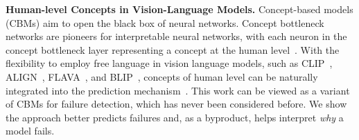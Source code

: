 \vspace{5pt}
\noindent\textbf{Human-level Concepts in Vision-Language Models.}
Concept-based models (CBMs) aim to open the black box of neural networks. 
Concept bottleneck networks are pioneers for interpretable neural networks, with each neuron in the concept bottleneck layer representing a concept at the human level~\cite{Koh2020ConceptBM, Yuksekgonul2022PosthocCB}.
With the flexibility to employ free language in vision language models, such as CLIP~\cite{Radford2021LearningTV}, ALIGN~\cite{Jia2021ScalingUV}, FLAVA~\cite{Singh2021FLAVAAF}, and BLIP~\cite{Li2022BLIPBL, Li2023BLIP2BL}, concepts of human level can be naturally integrated into the prediction mechanism~\cite{Menon2022VisualCV, Yang2022LanguageIA, Oikarinen2023LabelFreeCB}.
This work can be viewed as a variant of CBMs for failure detection, which has never been considered before.
We show the approach better predicts failures and, as a byproduct, helps interpret \textit{why} a model fails.